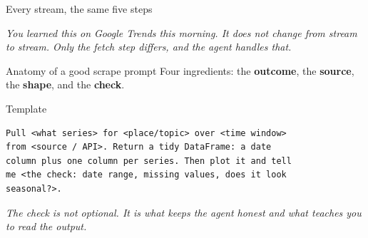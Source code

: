 \documentclass[aspectratio=169,11pt]{beamer}
\begin{document}
\begin{frame}{Every stream, the same five steps}
  \begin{center}
  \end{center}
  \vspace{0.4em}
  \begin{center}
    \itshape You learned this on Google Trends this morning. It does not change from stream
    to stream. Only the fetch step differs, and the agent handles that.
  \end{center}
\end{frame}

\begin{frame}[fragile]{Anatomy of a good scrape prompt}
  Four ingredients: the \textbf{outcome}, the \textbf{source}, the \textbf{shape}, and the
  \textbf{check}.
  \begin{block}{Template}
  \begin{lstlisting}
Pull <what series> for <place/topic> over <time window>
from <source / API>. Return a tidy DataFrame: a date
column plus one column per series. Then plot it and tell
me <the check: date range, missing values, does it look
seasonal?>.
  \end{lstlisting}
  \end{block}
  \begin{center}
    \itshape The check is not optional. It is what keeps the agent honest and what teaches
    you to read the output.
  \end{center}
\end{frame}
\end{document}
